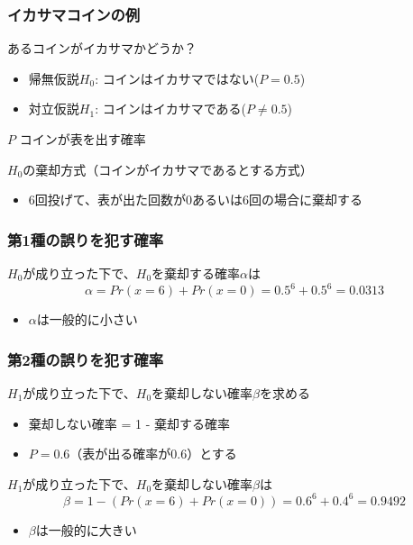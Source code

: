 \documentclass[aspectratio=169]{beamer}
\begin{document}
    \begin{frame}
        \frametitle{イカサマコインの例}
        あるコインがイカサマかどうか？
        \begin{itemize}
            \item 帰無仮説$H_0$: コインはイカサマではない($P = 0.5$)
            \item 対立仮説$H_1$: コインはイカサマである($P \neq 0.5$)
        \end{itemize}
        $P$ コインが表を出す確率
        \vspace{1cm}
        \begin{block}{$H_0$の棄却方式（コインがイカサマであるとする方式）}
            \begin{itemize}
                \item 6回投げて、表が出た回数が0あるいは6回の場合に棄却する
            \end{itemize}
        \end{block}
    \end{frame}

    \begin{frame}
        \frametitle{第1種の誤りを犯す確率}
            $H_0$が成り立った下で、$H_0$を棄却する確率$\alpha$は
            \begin{equation}
                \alpha = Pr(x=6)+Pr(x=0) = 0.5^6 + 0.5^6 = 0.0313
            \end{equation}

            \begin{itemize}
                \item $\alpha$は一般的に小さい
            \end{itemize}
    \end{frame}

    \begin{frame}
        \frametitle{第2種の誤りを犯す確率}
            $H_1$が成り立った下で、$H_0$を棄却しない確率$\beta$を求める
            \begin{itemize}
                \item 棄却しない確率 = 1 - 棄却する確率
                \item $P = 0.6$（表が出る確率が0.6）とする
            \end{itemize}

            $H_1$が成り立った下で、$H_0$を棄却しない確率$\beta$は
            \begin{equation}
                \beta = 1 - (Pr(x=6)+Pr(x=0)) = 0.6^6 + 0.4^6 = 0.9492
            \end{equation}

            \begin{itemize}
                \item $\beta$は一般的に大きい
            \end{itemize}
    \end{frame}
\end{document}
